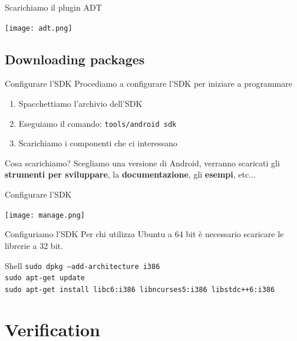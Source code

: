 \documentclass[xcolor=svgnames,11pt]{beamer}
\begin{document}
\begin{frame}{Scarichiamo il plugin ADT}
\begin{center}
\texttt{[image: adt.png]}
\end{center}
\end{frame}

\subsection{Downloading packages}
\begin{frame}{Configurare l'SDK}
Procediamo a configurare l'SDK per iniziare a programmare
\pause
	\begin{enumerate}
		\item Spacchettiamo l'archivio dell'SDK
		\pause
		\item Eseguiamo il comando: \texttt{tools/android sdk}
		\pause
		\item Scarichiamo i componenti che ci interessano
	\end{enumerate}
\pause
\medskip
\begin{block}{Cosa scarichiamo?}
Scegliamo una versione di Android, verranno scaricati gli \textbf{strumenti per sviluppare}, la \textbf{documentazione}, gli \textbf{esempi}, etc...
\end{block}
\end{frame}

\begin{frame}{Configurare l'SDK}
\begin{center}
\texttt{[image: manage.png]}
\end{center}
\end{frame}

\begin{frame}{Configuriamo l'SDK}
Per chi utilizza Ubuntu a 64 bit \`e necessario scaricare le librerie a 32 bit.
\pause
\medskip
\begin{block}{Shell}
\texttt{sudo dpkg --add-architecture i386}\\
\texttt{sudo apt-get update}\\
\texttt{sudo apt-get install libc6:i386 libncurses5:i386 libstdc++6:i386}
\end{block}
\end{frame}

\section{Verification}
\end{document}
